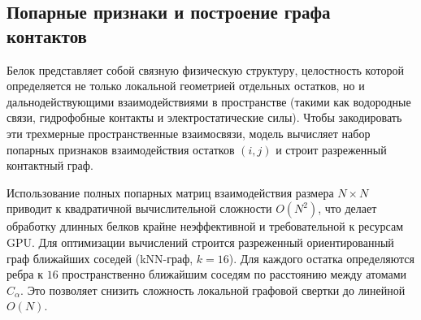 \documentclass[12pt, a4paper]{article}
\begin{document}
\subsection{Попарные признаки и построение графа контактов}
Белок представляет собой связную физическую структуру, целостность которой определяется не только локальной геометрией отдельных остатков, но и дальнодействующими взаимодействиями в пространстве (такими как водородные связи, гидрофобные контакты и электростатические силы). Чтобы закодировать эти трехмерные пространственные взаимосвязи, модель вычисляет набор попарных признаков взаимодействия остатков $(i, j)$ и строит разреженный контактный граф.

Использование полных попарных матриц взаимодействия размера $N \times N$ приводит к квадратичной вычислительной сложности $O(N^2)$, что делает обработку длинных белков крайне неэффективной и требовательной к ресурсам GPU. Для оптимизации вычислений строится разреженный ориентированный граф ближайших соседей (kNN-граф, $k=16$). Для каждого остатка определяются ребра к $16$ пространственно ближайшим соседям по расстоянию между атомами $C_\alpha$. Это позволяет снизить сложность локальной графовой свертки до линейной $O(N)$.
\end{document}
